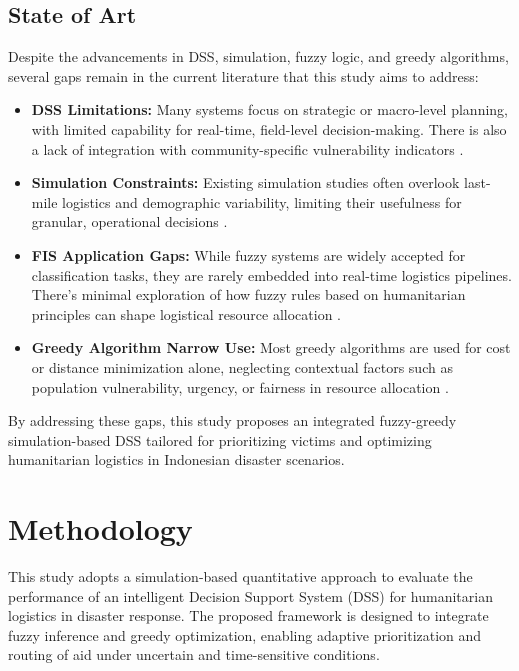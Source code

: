 \documentclass[journal,final,a4paper,twoside,11pt]{IEEEtran}
\begin{document}
\subsection{State of Art}
Despite the advancements in DSS, simulation, fuzzy logic, and greedy algorithms, several gaps remain in the current literature that this study aims to address:

\begin{itemize}
    \item \textbf{DSS Limitations:} Many systems focus on strategic or macro-level planning, with limited capability for real-time, field-level decision-making. There is also a lack of integration with community-specific vulnerability indicators \cite{steinhauser2025understanding}.
    \item \textbf{Simulation Constraints:} Existing simulation studies often overlook last-mile logistics and demographic variability, limiting their usefulness for granular, operational decisions \cite{ampaw2025developing}.
    \item \textbf{FIS Application Gaps:} While fuzzy systems are widely accepted for classification tasks, they are rarely embedded into real-time logistics pipelines. There's minimal exploration of how fuzzy rules based on humanitarian principles can shape logistical resource allocation \cite{anjomshoae2021integrated, improta2020fuzzy, jain2020membership, yoon2023novel}.
    \item \textbf{Greedy Algorithm Narrow Use:} Most greedy algorithms are used for cost or distance minimization alone, neglecting contextual factors such as population vulnerability, urgency, or fairness in resource allocation \cite{shirmarz2020adaptive, hamidouglu2023game}.
\end{itemize}

By addressing these gaps, this study proposes an integrated fuzzy-greedy simulation-based DSS tailored for prioritizing victims and optimizing humanitarian logistics in Indonesian disaster scenarios.


\section{Methodology} 

This study adopts a simulation-based quantitative approach to evaluate the performance of an intelligent Decision Support System (DSS) for humanitarian logistics in disaster response. The proposed framework is designed to integrate fuzzy inference and greedy optimization, enabling adaptive prioritization and routing of aid under uncertain and time-sensitive conditions.
\end{document}
